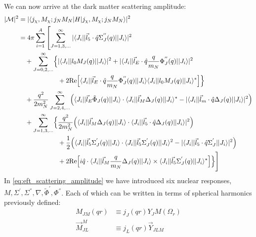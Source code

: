 We can now arrive at the dark matter scattering amplitude:
\begin{equation}
\begin{split}
    | \mathcal{M} |^2  &= |\langle j_\chi,M_\chi;j_N M_N | H | j_\chi,M_\chi;j_N M_N \rangle |^2 \\
    &= 4 \pi \sum_{i=1}^{A} \left[ \sum_{J=1,3,...}^{\infty} | \langle J_i||\vec{l}_5 \cdot \hat{q} \Sigma_{J}^{''}(q) || J_i \rangle |^2 \right. \\
    &\quad+ \sum_{J=0,2,...}^{\infty} \Bigl\{ | \langle J_i||l_0 M_J (q) || J_i \rangle |^2 + | \langle J_i||\vec{l}_E \cdot \hat{q} \frac{q}{m_N} \Phi^{''}_{J} (q) || J_i \rangle |^2 \\
    &\qquad\qquad\qquad+ 2\text{Re} \Bigl[ \langle J_i || \vec{l}_E \cdot \hat{q} \frac{q}{m_N} \Phi^{''}_{J}(q) || J_i\rangle \langle J_i||l_0 M_{J}(q)||J_i\rangle^*\Bigl] \Bigl\} \\
    &\quad+ \frac{q^2}{2m^2_N} \sum_{J=2,4,...}^{\infty} \Bigl( \langle J_i || \vec{l}_E \tilde{\Phi}_{J}(q) || J_i \rangle \cdot \langle J_i || \vec{l}_M \Delta_{J}(q) || J_i \rangle^* - |\langle J_i || \vec{l}_m \cdot \hat{q}\Delta_{J}(q) ||J_i \rangle |^2 \Bigl) \\
    &\quad+ \sum_{J=1,3,...}^{\infty} \Bigl\{ \frac{q^2}{2m^2_N} \Bigl( \langle J_i || \vec{l}_M \Delta_{J}(q) || J_i \rangle \cdot \langle J_i || \vec{l}_5 \cdot \hat{q}\Delta_{J}(q) || J_i \rangle |^2 \Bigl) \\
    &\qquad\qquad\qquad+ \frac{1}{2} \Bigl( \langle J_i|| \vec{l}_5 \Sigma^{'}_{J}(q) || J_i \rangle \cdot \langle J_i||\vec{l}_5 \Sigma^{'}_{J}(q) || J_i \rangle^2 - |\langle J_i||\vec{l}_5 \cdot \hat{q} \Sigma^{'}_{J} || J_i \rangle |^2 \Bigl) \\
    &\qquad\qquad\qquad+ 2\text{Re} \Bigl[ i\hat{q} \cdot \langle J_i || \vec{l}_M \frac{q}{m_N} \Delta_{J}(q) || J_i \rangle  \times \langle J_i||\vec{l}_{5} \Sigma^{'}_{J}(q) || J_i \rangle^* \Bigl] \Bigl\} \Biggr] 
\end{split}
\label{eq:eft_scattering_amplitude}
\end{equation}
In \autoref{eq:eft_scattering_amplitude} we have introduced six nuclear responses, $M,\Sigma^{'},\Sigma^{''},\nabla,\tilde{\Phi}^{'},\Phi^{''}$. 
Each of which can be written in terms of spherical harmonics previously defined:
\begin{equation}
\begin{split}
    M_{JM}(qr) &\equiv j_J(qr)Y_J M(\Omega_r) \\
    \vec{M}^{M}_{JL} &\equiv j_L (qr) \vec{Y}_{JLM}
\end{split}    
\end{equation}
